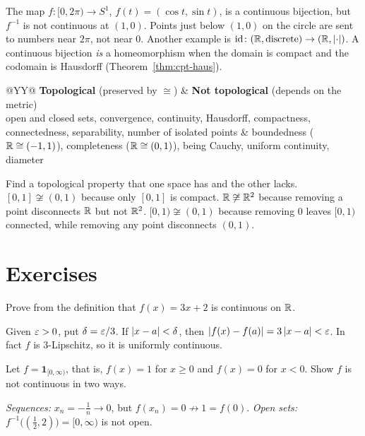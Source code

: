 \begin{warning}
The map $f\colon[0,2\pi)\to S^1$, $f(t)=(\cos t,\sin t)$, is a continuous bijection, but $f^{-1}$ is not continuous at $(1,0)$. Points just below $(1,0)$ on the circle are sent to numbers near $2\pi$, not near $0$. Another example is $\mathrm{id}\colon(\mathbb{R},\text{discrete})\to(\mathbb{R},\left\lvert \cdot\right\rvert)$. A continuous bijection \emph{is} a homeomorphism when the domain is compact and the codomain is Hausdorff (Theorem~\ref{thm:cpt-haus}).
\end{warning}

\begin{center}
\renewcommand{\arraystretch}{1.2}
\begin{tabularx}{\linewidth}{@{}YY@{}}
\toprule
\textbf{Topological} (preserved by $\cong$) & \textbf{Not topological} (depends on the metric)\\
\midrule
open and closed sets, convergence, continuity, Hausdorff, compactness, connectedness, separability, number of isolated points
&
boundedness ($\mathbb{R}\cong(-1,1)$), completeness ($\mathbb{R}\cong(0,1)$), being Cauchy, uniform continuity, diameter\\
\bottomrule
\end{tabularx}
\end{center}

\begin{examtip}
Find a topological property that one space has and the other lacks. $[0,1]\not\cong(0,1)$ because only $[0,1]$ is compact. $\mathbb{R}\not\cong\mathbb{R}^2$ because removing a point disconnects $\mathbb{R}$ but not $\mathbb{R}^2$. $[0,1)\not\cong(0,1)$ because removing $0$ leaves $[0,1)$ connected, while removing any point disconnects $(0,1)$.
\end{examtip}

\section{Exercises}
\begin{exercise}\easy
Prove from the definition that $f(x)=3x+2$ is continuous on $\mathbb{R}$.
\end{exercise}
\begin{solution}
Given $\varepsilon>0$, put $\delta=\varepsilon/3$. If $\left\lvert x-a\right\rvert<\delta$, then $\left\lvert f(x)-f(a)\right\rvert=3\left\lvert x-a\right\rvert<\varepsilon$. In fact $f$ is $3$-Lipschitz, so it is uniformly continuous.
\end{solution}

\begin{exercise}\easy
Let $f=\mathbf 1_{[0,\infty)}$, that is, $f(x)=1$ for $x\ge0$ and $f(x)=0$ for $x<0$. Show $f$ is not continuous in two ways.
\end{exercise}
\begin{solution}
\emph{Sequences:} $x_n=-\frac1n\to0$, but $f(x_n)=0\not\to1=f(0)$. \emph{Open sets:} $f^{-1}\bigl((\tfrac12,2)\bigr)=[0,\infty)$ is not open.
\end{solution}

